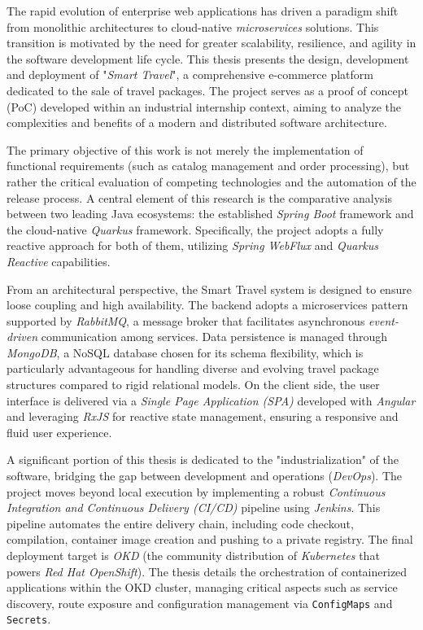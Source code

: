 
The rapid evolution of enterprise web applications has driven a paradigm shift from monolithic architectures to cloud-native \textit{microservices} solutions. This transition is motivated by the need for greater scalability, resilience, and agility in the software development life cycle. This thesis presents the design, development and deployment of "\textit{Smart Travel}", a comprehensive e-commerce platform dedicated to the sale of travel packages. The project serves as a proof of concept (\gls{PoC}) developed within an industrial internship context, aiming to analyze the complexities and benefits of a modern and distributed software architecture.

The primary objective of this work is not merely the implementation of functional requirements (such as catalog management and order processing), but rather the critical evaluation of competing technologies and the automation of the release process. A central element of this research is the comparative analysis between two leading Java ecosystems: the established \textit{Spring Boot} framework and the cloud-native \textit{Quarkus} framework. Specifically, the project adopts a fully reactive approach for both of them, utilizing \textit{Spring WebFlux} and \textit{Quarkus Reactive} capabilities.

From an architectural perspective, the Smart Travel system is designed to ensure loose coupling and high availability. The backend adopts a microservices pattern supported by \textit{RabbitMQ}, a message broker that facilitates asynchronous \textit{event-driven} communication among services. Data persistence is managed through \textit{MongoDB}, a \gls{NoSQL} database chosen for its schema flexibility, which is particularly advantageous for handling diverse and evolving travel package structures compared to rigid relational models. On the client side, the user interface is delivered via a \textit{Single Page Application (\gls{SPA})} developed with \textit{Angular} and leveraging \textit{\gls{RxJS}} for reactive state management, ensuring a responsive and fluid user experience.

A significant portion of this thesis is dedicated to the "industrialization" of the software, bridging the gap between development and operations (\textit{DevOps}). The project moves beyond local execution by implementing a robust \textit{Continuous Integration and Continuous Delivery (\gls{CI/CD})} pipeline using \textit{Jenkins}. This pipeline automates the entire delivery chain, including code checkout, compilation, container image creation and pushing to a private registry. The final deployment target is \textit{OKD} (the community distribution of \textit{Kubernetes} that powers \textit{Red Hat OpenShift}). The thesis details the orchestration of containerized applications within the OKD cluster, managing critical aspects such as service discovery, route exposure and configuration management via \texttt{ConfigMaps} and \texttt{Secrets}.

